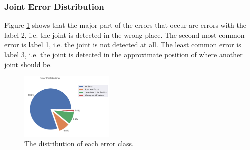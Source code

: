 \subsubsection{Joint Error Distribution}

Figure \ref{fig:jt_pie} shows that the major part of the errors that occur are errors with the label 2, i.e. the joint is detected in the wrong place. The second most common error is label 1, i.e. the joint is not detected at all. The least common error is label 3, i.e. the joint is detected in the approximate position of where another joint should be.

\begin{figure}[ht]
  \centering
  \includegraphics[width=0.4\textwidth]{figures/Data/dist_joints/Error_Distribution.png}
  \caption[Error Distribution for each error class]{The distribution of each error class.}
  \label{fig:jt_pie}
\end{figure}

